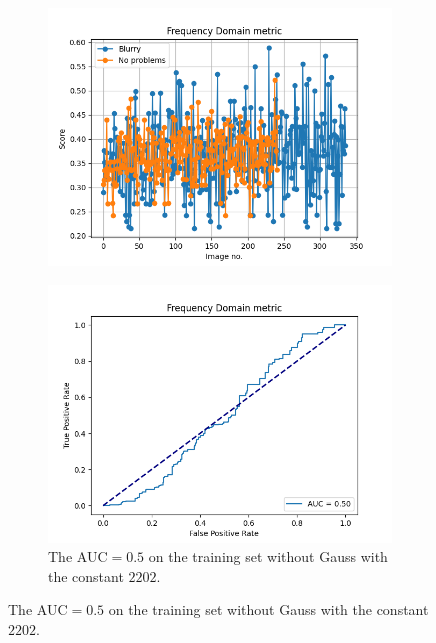 \begin{figure}[H]
    \begin{subfigure}[t]{0.48\textwidth}
        \includegraphics[width=\textwidth]{Figures/tweakFM/2202_output_basic.png}
        \caption{}
        \label{fig:FM_basic_2202}
    \end{subfigure}\hspace{1em}
    \begin{subfigure}[t]{0.48\textwidth}
        \includegraphics[width=\textwidth]{Figures/tweakFM/2202_output_roc.png}
        \caption{The AUC$=0.5$ on the training set without Gauss with the constant $2202$.}
        \label{fig:FM_roc_2202}
    \end{subfigure}\hspace{1em}

\end{figure}
